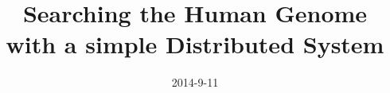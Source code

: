 \documentclass[conference]{IEEEtran}
\begin{document}
\title{Searching the Human Genome  with a simple Distributed System}
\date{2014-9-11}

\author{
}
\maketitle












\end{document}
